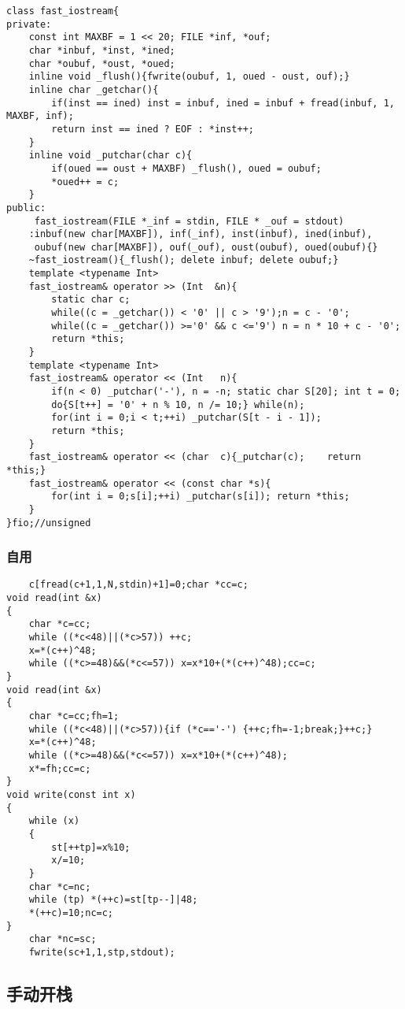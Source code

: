 \documentclass[12pt]{ctexart}
\begin{document}
\begin{lstlisting}
class fast_iostream{
private:
	const int MAXBF = 1 << 20; FILE *inf, *ouf;
	char *inbuf, *inst, *ined;
	char *oubuf, *oust, *oued;
	inline void _flush(){fwrite(oubuf, 1, oued - oust, ouf);}
	inline char _getchar(){
		if(inst == ined) inst = inbuf, ined = inbuf + fread(inbuf, 1, MAXBF, inf);
		return inst == ined ? EOF : *inst++;
	}
	inline void _putchar(char c){
		if(oued == oust + MAXBF) _flush(), oued = oubuf;
		*oued++ = c;
	}
public:
	 fast_iostream(FILE *_inf = stdin, FILE * _ouf = stdout)
	:inbuf(new char[MAXBF]), inf(_inf), inst(inbuf), ined(inbuf),
	 oubuf(new char[MAXBF]), ouf(_ouf), oust(oubuf), oued(oubuf){}
	~fast_iostream(){_flush(); delete inbuf; delete oubuf;}
	template <typename Int>
	fast_iostream& operator >> (Int  &n){
		static char c;
		while((c = _getchar()) < '0' || c > '9');n = c - '0';
		while((c = _getchar()) >='0' && c <='9') n = n * 10 + c - '0';
		return *this;
	}
	template <typename Int>
	fast_iostream& operator << (Int   n){
		if(n < 0) _putchar('-'), n = -n; static char S[20]; int t = 0;
		do{S[t++] = '0' + n % 10, n /= 10;} while(n);
		for(int i = 0;i < t;++i) _putchar(S[t - i - 1]);
		return *this;
	}
	fast_iostream& operator << (char  c){_putchar(c);    return *this;}
	fast_iostream& operator << (const char *s){
		for(int i = 0;s[i];++i) _putchar(s[i]); return *this;
	}
}fio;//unsigned
\end{lstlisting}

\subsubsection{自用}

\begin{lstlisting}
	c[fread(c+1,1,N,stdin)+1]=0;char *cc=c;
void read(int &x)
{
	char *c=cc;
	while ((*c<48)||(*c>57)) ++c;
	x=*(c++)^48;
	while ((*c>=48)&&(*c<=57)) x=x*10+(*(c++)^48);cc=c;
}
void read(int &x)
{
	char *c=cc;fh=1;
	while ((*c<48)||(*c>57)){if (*c=='-') {++c;fh=-1;break;}++c;}
	x=*(c++)^48;
	while ((*c>=48)&&(*c<=57)) x=x*10+(*(c++)^48);
	x*=fh;cc=c;
}
void write(const int x)
{
	while (x)
	{
		st[++tp]=x%10;
		x/=10;
	}
	char *c=nc;
	while (tp) *(++c)=st[tp--]|48;
	*(++c)=10;nc=c;
}
	char *nc=sc;
	fwrite(sc+1,1,stp,stdout);
\end{lstlisting}

\subsection{手动开栈}
\end{document}
